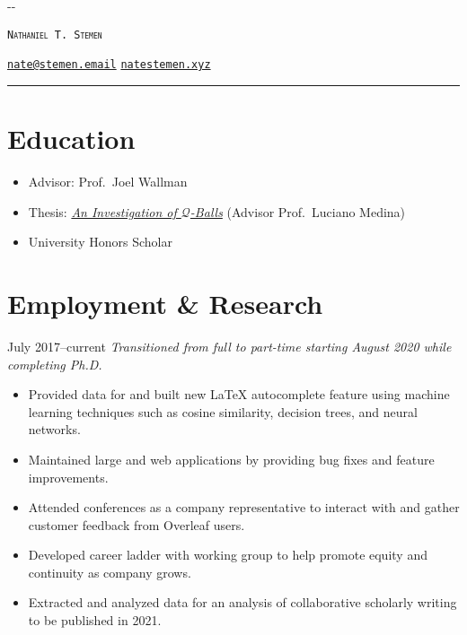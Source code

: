 \documentclass{cultvoucher}
\begin{document}
\thispagestyle{firststyle}

\begin{adjustwidth}{\dimexpr-\marginparsep-\marginparwidth}{}
	\begin{center}
		{\Huge \textsc{\texttt{Nathaniel T. Stemen}}\par}
		\href{mailto:nate@stemen.email}{\texttt{nate@stemen.email}} \textbullet{}
		\href{https://natestemen.xyz}{\texttt{natestemen.xyz}}
		\rule{\dimexpr\textwidth+\marginparsep+\marginparwidth}{0.4pt}\par
	\end{center}
\end{adjustwidth}

\section{Education}
\begin{itemize}
	\vspace{-0.25em}
	\item Advisor: Prof.\ Joel Wallman
\end{itemize}

\begin{itemize}
	\vspace{-0.25em}
	\item Thesis: \href{https://natestemen.xyz/qv-thesis.pdf}{\textit{An Investigation of $\mathcal{Q}$-Balls}} (Advisor Prof.\ Luciano Medina)
	\item University Honors Scholar
\end{itemize}

\section{Employment \& Research}
{July 2017--current}
\vspace{-0.25em}
\emph{Transitioned from full to part-time starting August 2020 while completing Ph.D.}
\begin{itemize}
	\vspace{-0.25em}
	\item Provided data for and built new \LaTeX{} autocomplete feature using machine learning techniques such as cosine similarity, decision trees, and neural networks.
	\item Maintained large  and  web applications by providing bug fixes and feature improvements.
	\item Attended conferences as a company representative to interact with and gather customer feedback from Overleaf users.
	\item Developed career ladder with working group to help promote equity and continuity as company grows. 
	\item Extracted and analyzed data for an analysis of collaborative scholarly writing to be published in 2021.
\end{itemize}
\end{document}
